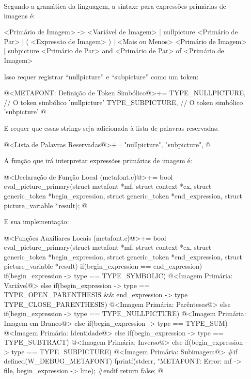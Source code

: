 {

Segundo a gramática da linguagem, a sintaxe para expressões primárias
de imagens é:

\alinhaverbatim
<Primário de Imagem> -> <Variável de Imagem> |
                        nullpicture <Primário de Par> |
                        ( <Expressão de Imagem> ) |
                        <Mais ou Menos> <Primário de Imagem> |
                        subpicture <Primário de Par> and <Primário de Par> of
                                   <Primário de Imagem>
\alinhanormal

Isso requer registrar ``nullpicture'' e ``subpicture'' como um token:

\iniciocodigo
@<METAFONT: Definição de Token Simbólico@>+=
TYPE_NULLPICTURE,        // O token simbólico 'nullpicture'
TYPE_SUBPICTURE,         // O token simbólico 'subpicture'
@
\fimcodigo

E requer que essas strings seja adicionada à lista de palavras reservadas:

\iniciocodigo
@<Lista de Palavras Reservadas@>+=
"nullpicture", "subpicture",
@
\fimcodigo

A função que irá interpretar expressões primárias de imagem é:

\iniciocodigo
@<Declaração de Função Local (metafont.c)@>+=
bool eval_picture_primary(struct metafont *mf, struct context *cx,
                          struct generic_token *begin_expression,
                          struct generic_token *end_expression,
                          struct picture_variable *result);
@
\fimcodigo

E sua implementação:

\iniciocodigo
@<Funções Auxiliares Locais (metafont.c)@>+=
bool eval_picture_primary(struct metafont *mf, struct context *cx,
                         struct generic_token *begin_expression,
                         struct generic_token *end_expression,
                         struct picture_variable *result){
  if(begin_expression == end_expression){
    if(begin_expression -> type == TYPE_SYMBOLIC){
      @<Imagem Primária: Variável@>
    }
  }
  else{
    if(begin_expression -> type == TYPE_OPEN_PARENTHESIS &&
      end_expression -> type == TYPE_CLOSE_PARENTHESIS){
      @<Imagem Primária: Parênteses@>
    }
    else if(begin_expression -> type == TYPE_NULLPICTURE){
      @<Imagem Primária: Imagem em Branco@>
    }
    else if(begin_expression -> type == TYPE_SUM){
      @<Imagem Primária: Identidade@>
    }
    else if(begin_expression -> type == TYPE_SUBTRACT){
      @<Imagem Primária: Inverso@>
    }
    else if(begin_expression -> type == TYPE_SUBPICTURE){
      @<Imagem Primária: Subimagem@>
    }
  }
#if defined(W_DEBUG_METAFONT)
  fprintf(stderr, "METAFONT: Error: %
          mf -> file, begin_expression -> line);
#endif
  return false;
}
@
\fimcodigo

}
